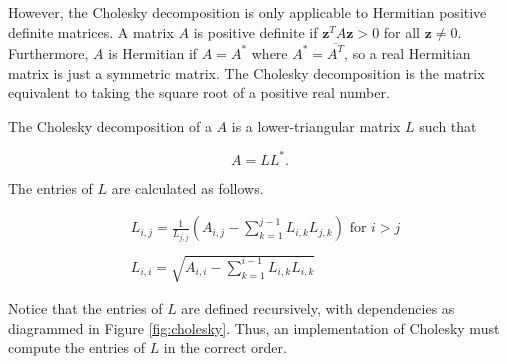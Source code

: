 However, the Cholesky decomposition is only applicable to Hermitian positive definite matrices. A matrix $A$ is positive definite if  $\mathbf{z}^TA\mathbf{z} > 0$ for all $\mathbf{z} \neq 0$. Furthermore, $A$ is Hermitian if $A = A^*$ where $A^* = \overline{A^T}$, so a real Hermitian matrix is just a symmetric matrix. The Cholesky decomposition is the matrix equivalent to taking the square root of a positive real number.

The Cholesky decomposition of a $A$ is a lower-triangular matrix $L$ such that

\begin{equation*}
 A = LL^*.
\end{equation*}

The entries of $L$ are calculated as follows.

\begin{align*}
&L_{i,j} = \frac{1}{L_{j,j}}\left(A_{i,j} -\sum_{k=1}^{j-1}{L_{i,k}L_{j,k}}\right) \mbox{ for $i>j$} \\ \\
&L_{i,i} = \sqrt{A_{i,i} - \sum_{k=1}^{i-1}{L_{i,k}L_{i,k}}}
\end{align*}

Notice that the entries of $L$ are defined recursively, with dependencies as diagrammed in Figure \ref{fig:cholesky}. Thus, an implementation of Cholesky must compute the entries of $L$ in the correct order.

